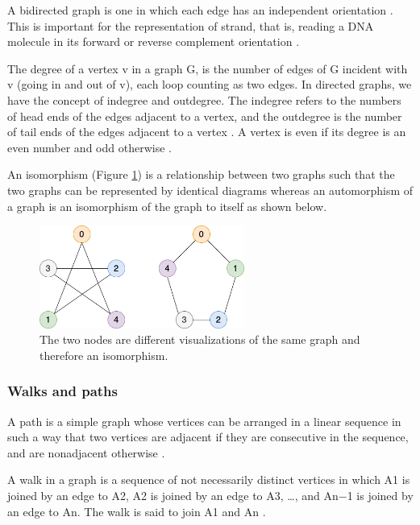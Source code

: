 \documentclass[10pt, a4paper]{article}
\begin{document}
A bidirected graph is one in which each edge has an independent orientation
\cite{edmondsMatchingWellSolvedClass2003}.
This is important for the representation of strand,
that is, reading a DNA molecule in its forward or reverse complement orientation
\cite{patenGenomeGraphsEvolution2017}.

The degree of a vertex v in a graph G, is the number of edges of G incident with
v (going in and out of v), each loop counting as two edges.
In directed graphs, we have the concept of indegree and outdegree.
The indegree refers to the numbers of head ends of the edges adjacent to a
vertex, and the outdegree is the number of tail ends of the edges adjacent to a
vertex \cite{bondyGraphTheory2011}. A vertex is even if its degree is an even number
and odd otherwise \cite{trudeauIntroductionGraphTheory1993}.

An isomorphism (Figure \ref{fig:orgcb3555f}) is a relationship between two graphs such
that the two graphs can be represented by identical diagrams
\cite{bondyGraphTheory2011}
whereas an automorphism of a graph is an isomorphism of the graph to itself as
shown below.

\begin{figure}[h]
\centering
\includegraphics[width=0.6\textwidth]{../Figures/Isomorphism.png}
\caption[A graph isomorphism]{\label{fig:orgcb3555f}The two nodes are different visualizations of the same graph and therefore an isomorphism.}
\end{figure}

\subsubsection{Walks and paths}
\label{sec:org9aa98b8}
A path is a simple graph whose vertices can be arranged in a linear sequence in
such a way that two vertices are adjacent if they are consecutive in the
sequence, and are nonadjacent otherwise \cite{bondyGraphTheory2011}.


A walk in a graph is a sequence  of not necessarily distinct vertices in which
A1 is joined by an edge to A2, A2 is joined by an edge to A3, \ldots{}, and An−1 is
joined by an edge to An. The walk is said to join A1 and An
\cite{trudeauIntroductionGraphTheory1993}.
\end{document}
